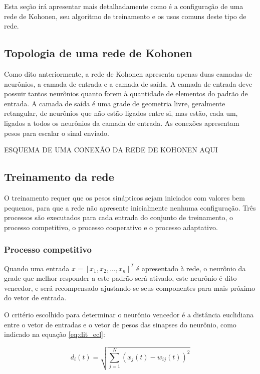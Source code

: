 Esta seção irá apresentar mais detalhadamente como é a configuração de uma rede
de Kohonen, seu algoritmo de treinamento e os usos comuns deste tipo de rede.

\subsection{Topologia de uma rede de Kohonen}

Como dito anteriormente, a rede de Kohonen apresenta apenas duas camadas de
neurônios, a camada de entrada e a camada de saída. A camada de entrada deve
possuir tantos neurônios quanto forem à quantidade de elementos do padrão de
entrada. A camada de saída é uma grade de geometria livre, geralmente
retangular, de neurônios que não estão ligados entre si, mas estão, cada um,
ligados a todos os neurônios da camada de entrada. As conexões apresentam pesos
para escalar o sinal enviado.

ESQUEMA DE UMA CONEXÃO DA REDE DE KOHONEN AQUI

\subsection{Treinamento da rede}

O treinamento requer que os pesos sinápticos sejam iniciados com valores bem
pequenos, para que a rede não apresente inicialmente nenhuma configuração. Três
processos são executados para cada entrada do conjunto de treinamento, o
processo competitivo, o processo cooperativo e o processo adaptativo.

\subsubsection{Processo competitivo}

Quando uma entrada $ x = \left[x_1, x_2, ..., x_n\right]^T $ é apresentado à
rede, o neurônio da grade que melhor responder a este padrão será ativado, este
neurônio é dito vencedor, e será recompensado ajustando-se seus componentes
para mais próximo do vetor de entrada.

O critério escolhido para determinar o neurônio vencedor é a distância
euclidiana entre o vetor de entradas e o vetor de pesos das sinapses do
neurônio, como indicado na equação \ref{eq:dit_ecl}:

\begin{equation}\label{eq:dit_ecl}
d_i(t) = \sqrt{\sum_{j = 1}^N \left( x_j(t) - w_{ij}(t) \right)^2}
\end{equation}

